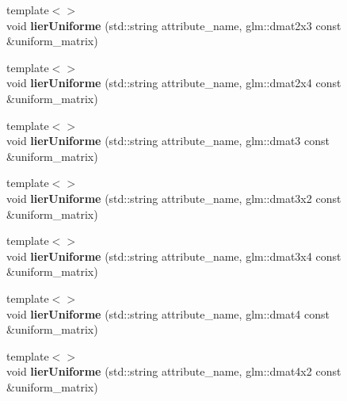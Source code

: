 \begin{DoxyCompactItemize}
\item 
\hypertarget{classopengl_1_1_programme_a3ccc5bd24bcff0b5144803ac5d3ca578}{{\footnotesize template$<$$>$ }\\void {\bfseries lier\-Uniforme} (std\-::string attribute\-\_\-name, glm\-::dmat2x3 const \&uniform\-\_\-matrix)}\label{classopengl_1_1_programme_a3ccc5bd24bcff0b5144803ac5d3ca578}

\item 
\hypertarget{classopengl_1_1_programme_ae10433ef6ec342e6b03b67354c7a2b8c}{{\footnotesize template$<$$>$ }\\void {\bfseries lier\-Uniforme} (std\-::string attribute\-\_\-name, glm\-::dmat2x4 const \&uniform\-\_\-matrix)}\label{classopengl_1_1_programme_ae10433ef6ec342e6b03b67354c7a2b8c}

\item 
\hypertarget{classopengl_1_1_programme_a53c84af502eb17f4f3683927fe679421}{{\footnotesize template$<$$>$ }\\void {\bfseries lier\-Uniforme} (std\-::string attribute\-\_\-name, glm\-::dmat3 const \&uniform\-\_\-matrix)}\label{classopengl_1_1_programme_a53c84af502eb17f4f3683927fe679421}

\item 
\hypertarget{classopengl_1_1_programme_a2ac6cee4fc61c3ef154ce06d60f95ad9}{{\footnotesize template$<$$>$ }\\void {\bfseries lier\-Uniforme} (std\-::string attribute\-\_\-name, glm\-::dmat3x2 const \&uniform\-\_\-matrix)}\label{classopengl_1_1_programme_a2ac6cee4fc61c3ef154ce06d60f95ad9}

\item 
\hypertarget{classopengl_1_1_programme_ab1d99d2800a2c39fb12c5234485e0650}{{\footnotesize template$<$$>$ }\\void {\bfseries lier\-Uniforme} (std\-::string attribute\-\_\-name, glm\-::dmat3x4 const \&uniform\-\_\-matrix)}\label{classopengl_1_1_programme_ab1d99d2800a2c39fb12c5234485e0650}

\item 
\hypertarget{classopengl_1_1_programme_a6c104e8c3bdf62532bc7d036bc3a2ab0}{{\footnotesize template$<$$>$ }\\void {\bfseries lier\-Uniforme} (std\-::string attribute\-\_\-name, glm\-::dmat4 const \&uniform\-\_\-matrix)}\label{classopengl_1_1_programme_a6c104e8c3bdf62532bc7d036bc3a2ab0}

\item 
\hypertarget{classopengl_1_1_programme_a86ee8e39f26bf744d6113b9f3e70742e}{{\footnotesize template$<$$>$ }\\void {\bfseries lier\-Uniforme} (std\-::string attribute\-\_\-name, glm\-::dmat4x2 const \&uniform\-\_\-matrix)}\label{classopengl_1_1_programme_a86ee8e39f26bf744d6113b9f3e70742e}


\end{DoxyCompactItemize}
